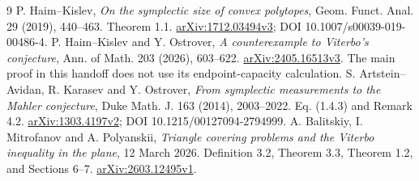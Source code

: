 \documentclass[11pt,a4paper]{article}
\theoremstyle{definition}\newtheorem{definition}[theorem]{Definition}
\theoremstyle{remark}\newtheorem{remark}[theorem]{Remark}
\begin{document}
\begin{thebibliography}{9}
 P. Haim--Kislev, \emph{On the symplectic size of convex polytopes}, Geom. Funct. Anal. 29 (2019), 440--463. Theorem 1.1. \href{https://arxiv.org/html/1712.03494v3}{arXiv:1712.03494v3}; DOI 10.1007/s00039-019-00486-4.
 P. Haim--Kislev and Y. Ostrover, \emph{A counterexample to Viterbo's conjecture}, Ann. of Math. 203 (2026), 603--622. \href{https://arxiv.org/html/2405.16513v3}{arXiv:2405.16513v3}. The main proof in this handoff does not use its endpoint-capacity calculation.
 S. Artstein--Avidan, R. Karasev and Y. Ostrover, \emph{From symplectic measurements to the Mahler conjecture}, Duke Math. J. 163 (2014), 2003--2022. Eq. (1.4.3) and Remark 4.2. \href{https://arxiv.org/html/1303.4197v2}{arXiv:1303.4197v2}; DOI 10.1215/00127094-2794999.
 A. Balitskiy, I. Mitrofanov and A. Polyanskii, \emph{Triangle covering problems and the Viterbo inequality in the plane}, 12 March 2026. Definition 3.2, Theorem 3.3, Theorem 1.2, and Sections 6--7. \href{https://arxiv.org/html/2603.12495v1}{arXiv:2603.12495v1}.
\end{thebibliography}
\end{document}
